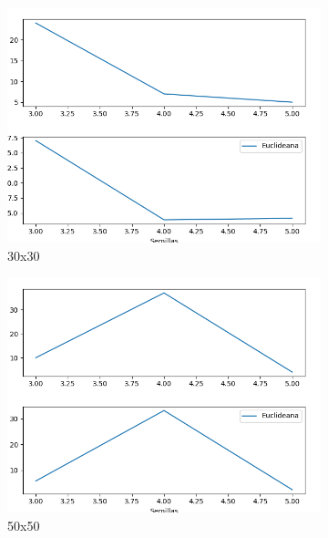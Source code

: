 \documentclass{article}
\begin{document}
\begin{figure}[H]
       \centering
       \begin{subfigure}[b]{0.7\linewidth}
           \includegraphics[width=\linewidth]{30x30.png}
           \caption{30x30}
           \label{fig:westminster_lateral}
        \end{subfigure}
        \begin{subfigure}[b]{0.7\linewidth}
            \includegraphics[width=\linewidth]{50x50.png}
            \caption{50x50}
            \label{fig:westminster_aerea}
        \end{subfigure}
        \begin{subfigure}[b]{0.7\linewidth}

\end{subfigure}
\end{figure}
\end{document}
